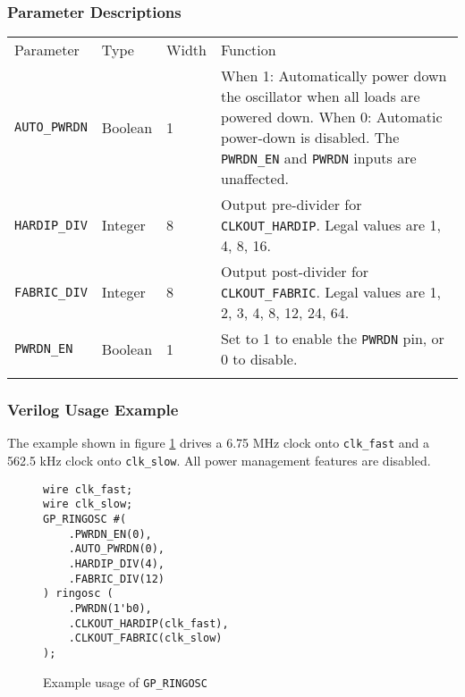 \documentclass[11pt]{article}
\newcommand{\tokenstyle}[1]{\texttt{#1}}
\newcommand{\wirestyle}[1]{\texttt{#1}}
\newcommand{\whenstyle}[1]{{\fontseries{sb}\selectfont#1}}
\newcommand{\thinhline}{\Xhline{1\arrayrulewidth}}
\newcommand{\thickhline}{\Xhline{2.5\arrayrulewidth}}
\begin{document}
\subsubsection{Parameter Descriptions}

\begin{tabularx}{\textwidth}{lllX}
\thinhline
\whenstyle{Parameter} & \whenstyle{Type} & \whenstyle{Width} & \whenstyle{Function} \\
\thickhline
\tokenstyle{AUTO\_PWRDN} & Boolean & 1 &
	\whenstyle{When 1:} Automatically power down the oscillator when all loads are powered down. \newline
	\whenstyle{When 0:} Automatic power-down is disabled. The \tokenstyle{PWRDN\_EN} and \tokenstyle{PWRDN} inputs are unaffected.\\
\thinhline
\tokenstyle{HARDIP\_DIV} & Integer & 8 &
	Output pre-divider for \tokenstyle{CLKOUT\_HARDIP}. Legal values are 1, 4, 8, 16. \\
\thinhline
\tokenstyle{FABRIC\_DIV} & Integer & 8 &
	Output post-divider for \tokenstyle{CLKOUT\_FABRIC}. Legal values are 1, 2, 3, 4, 8, 12, 24, 64. \\
\thinhline
\tokenstyle{PWRDN\_EN} & Boolean & 1 & Set to 1 to enable the \tokenstyle{PWRDN} pin, or 0 to disable. \\
\thinhline
\end{tabularx}

\pagebreak
\subsubsection{Verilog Usage Example}

The example shown in figure \ref{gp-ringosc-example} drives a 6.75 MHz clock onto \wirestyle{clk\_fast} and a 562.5 kHz clock onto
\wirestyle{clk\_slow}. All power management features are disabled.

\begin{figure}[h]
\begin{lstlisting}
wire clk_fast;
wire clk_slow;
GP_RINGOSC #(
	.PWRDN_EN(0),
	.AUTO_PWRDN(0),
	.HARDIP_DIV(4),
	.FABRIC_DIV(12)
) ringosc (
	.PWRDN(1'b0),
	.CLKOUT_HARDIP(clk_fast),
	.CLKOUT_FABRIC(clk_slow)
);
\end{lstlisting}
\caption{Example usage of \tokenstyle{GP\_RINGOSC}}
\label{gp-ringosc-example}
\end{figure}

\end{document}
